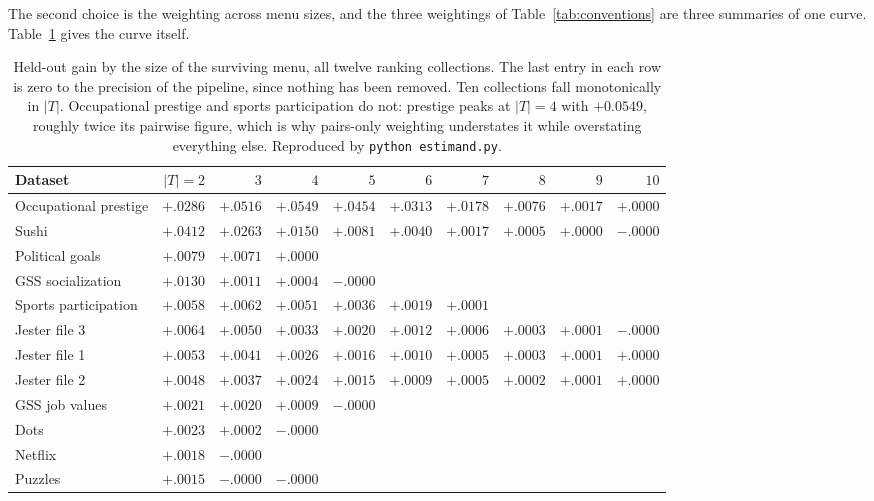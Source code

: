 \documentclass[11pt]{article}
\begin{document}
The second choice is the weighting across menu sizes, and the three weightings of
Table~\ref{tab:conventions} are three summaries of one curve. Table~\ref{tab:sizevector}
gives the curve itself.

\begin{table}[ht]
\centering
\footnotesize
\setlength{\tabcolsep}{4pt}
\begin{tabular}{lrrrrrrrrr}
\toprule
Dataset & $|T|=2$ & $3$ & $4$ & $5$ & $6$ & $7$ & $8$ & $9$ & $10$ \\
\midrule
Occupational prestige & $+.0286$ & $+.0516$ & $+.0549$ & $+.0454$ & $+.0313$ & $+.0178$ & $+.0076$ & $+.0017$ & $+.0000$ \\
Sushi & $+.0412$ & $+.0263$ & $+.0150$ & $+.0081$ & $+.0040$ & $+.0017$ & $+.0005$ & $+.0000$ & $-.0000$ \\
Political goals & $+.0079$ & $+.0071$ & $+.0000$ & & & & & & \\
GSS socialization & $+.0130$ & $+.0011$ & $+.0004$ & $-.0000$ & & & & & \\
Sports participation & $+.0058$ & $+.0062$ & $+.0051$ & $+.0036$ & $+.0019$ & $+.0001$ & & & \\
Jester file 3 & $+.0064$ & $+.0050$ & $+.0033$ & $+.0020$ & $+.0012$ & $+.0006$ & $+.0003$ & $+.0001$ & $-.0000$ \\
Jester file 1 & $+.0053$ & $+.0041$ & $+.0026$ & $+.0016$ & $+.0010$ & $+.0005$ & $+.0003$ & $+.0001$ & $+.0000$ \\
Jester file 2 & $+.0048$ & $+.0037$ & $+.0024$ & $+.0015$ & $+.0009$ & $+.0005$ & $+.0002$ & $+.0001$ & $+.0000$ \\
GSS job values & $+.0021$ & $+.0020$ & $+.0009$ & $-.0000$ & & & & & \\
Dots & $+.0023$ & $+.0002$ & $-.0000$ & & & & & & \\
Netflix & $+.0018$ & $-.0000$ & & & & & & & \\
Puzzles & $+.0015$ & $-.0000$ & $-.0000$ & & & & & & \\
\bottomrule
\end{tabular}
\caption{Held-out gain by the size of the surviving menu, all twelve ranking collections.
The last entry in each row is zero to the precision of the pipeline, since nothing has been
removed. Ten collections fall monotonically in $|T|$. Occupational prestige and sports
participation do not: prestige peaks at $|T| = 4$ with $+0.0549$, roughly twice its pairwise
figure, which is why pairs-only weighting understates it while overstating everything else.
Reproduced by \texttt{python estimand.py}.}
\label{tab:sizevector}
\end{table}
\end{document}
